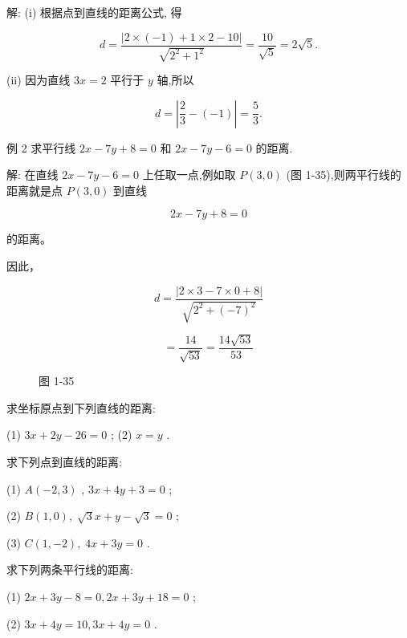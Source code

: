 \documentclass[lang=cn,newtx,12pt,scheme=chinese]{elegantbook}
\begin{document}
解: (i) 根据点到直线的距离公式, 得

\[
  d = \frac{\left| 2 \times \left( -1\right) + 1 \times 2 - {10}\right| }{\sqrt{{2}^{2} + {1}^{2}}} = \frac{10}{\sqrt{5}} = 2\sqrt{5}.
\]

(ii) 因为直线 \({3x} = 2\) 平行于 \(y\) 轴,所以

\[
  d = \left| {\frac{2}{3} - \left( {-1}\right) }\right| = \frac{5}{3}.
\]

例 2 求平行线 \({2x} - {7y} + 8 = 0\) 和 \({2x} - {7y} - 6 = 0\) 的距离.

解: 在直线 \({2x} - {7y} - 6 = 0\) 上任取一点,例如取 \(P\left( {3,0}\right)\) (图 1-35),则两平行线的距离就是点 \(P\left( {3,0}\right)\) 到直线

\[
    {2x} - {7y} + 8 = 0
\]

的距离。

因此，

\[
  d = \frac{\left| 2 \times 3 - 7 \times 0 + 8\right| }{\sqrt{{2}^{2} + {\left( -7\right) }^{2}}}
\]

\[
  = \frac{14}{\sqrt{53}} = \frac{{14}\sqrt{53}}{53}
\]

\begin{figure}[h]
	\centering
	
	\caption{图 1-35}
\end{figure}

\begin{problemset}[练习]

\item 求坐标原点到下列直线的距离:

(1) \({3x} + {2y} - {26} = 0\) ; (2) \(x = y\) .

\item 求下列点到直线的距离:

(1) \(A\left( {-2,3}\right)\) , \({3x} + {4y} + 3 = 0\) ;

(2) \(B\left( {1,0}\right) ,\;\sqrt{3}x + y - \sqrt{3} = 0\) ;

(3) \(C\left( {1, - 2}\right) ,\;{4x} + {3y} = 0\) .

\item 求下列两条平行线的距离:

(1) \({2x} + {3y} - 8 = 0,{2x} + {3y} + {18} = 0\) ;

(2) \({3x} + {4y} = {10},{3x} + {4y} = 0\) .

\end{problemset}
\end{document}
